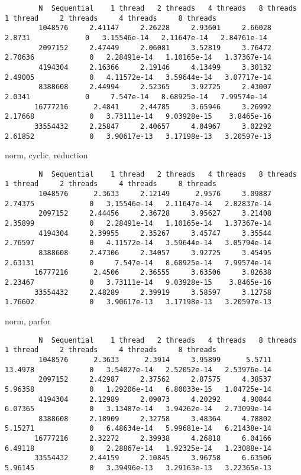 \documentclass[]{article}
\begin{document}
    \begin{lstlisting}
        N  Sequential    1 thread   2 threads   4 threads   8 threads      1 thread     2 threads     4 threads     8 threads
        1048576     2.41147     2.26228     2.93601     2.66028      2.8731             0   3.15546e-14   2.11647e-14   2.84761e-14
        2097152     2.47449     2.06081     3.52819     3.76472     2.70636             0   2.28491e-14   1.10165e-14   1.37367e-14
        4194304     2.16366     2.19146     4.13499     3.30132     2.49005             0   4.11572e-14   3.59644e-14   3.07717e-14
        8388608     2.44994     2.52365     3.92725     2.43007      2.0341             0     7.547e-14   8.68925e-14   7.99574e-14
       16777216      2.4841     2.44785     3.65946     3.26992     2.17668             0   3.73111e-14   9.03928e-15    3.8465e-16
       33554432     2.25847     2.40657     4.04967     3.02292     2.61852             0   3.90617e-13   3.17198e-13   3.20597e-13   
    \end{lstlisting}
    norm, cyclic, reduction 
    \begin{lstlisting}
        N  Sequential    1 thread   2 threads   4 threads   8 threads      1 thread     2 threads     4 threads     8 threads
        1048576      2.3633     2.12149      2.9576     3.09887     2.74375             0   3.15546e-14   2.11647e-14   2.82837e-14
        2097152     2.44456     2.36728     3.95627     3.21408     2.35899             0   2.28491e-14   1.10165e-14   1.37367e-14
        4194304     2.39955     2.35267     3.45747     3.35544     2.76597             0   4.11572e-14   3.59644e-14   3.05794e-14
        8388608     2.47306     2.34057     3.92725     3.45495     2.63131             0     7.547e-14   8.68925e-14   7.99574e-14
       16777216      2.4506     2.36555     3.63506     3.82638     2.23467             0   3.73111e-14   9.03928e-15    3.8465e-16
       33554432     2.48289     2.39919     3.58597     3.12758     1.76602             0   3.90617e-13   3.17198e-13   3.20597e-13   
    \end{lstlisting}
    norm, parfor
    \begin{lstlisting}
        N  Sequential    1 thread   2 threads   4 threads   8 threads      1 thread     2 threads     4 threads     8 threads
        1048576      2.3633      2.3914     3.95899      5.5711     13.4978             0   3.54027e-14   2.52052e-14   2.53976e-14
        2097152     2.42987     2.37562     2.87575     4.38537     5.96358             0   1.29206e-14   6.80033e-15   1.04725e-14
        4194304     2.12989     2.09073     4.20292     4.90844     6.07365             0   3.13487e-14   3.94262e-14   2.73099e-14
        8388608     2.18909     2.32758     3.48364     4.78802     5.15271             0   6.48634e-14   5.99681e-14   6.21438e-14
       16777216     2.32272     2.39938     4.26818     6.04166     6.49118             0   2.28867e-14   1.92325e-14   1.23088e-14
       33554432     2.44159     2.10845     3.96758     6.63506     5.96145             0   3.39496e-13   3.29163e-13   3.22365e-13   
    \end{lstlisting}
\end{document}
